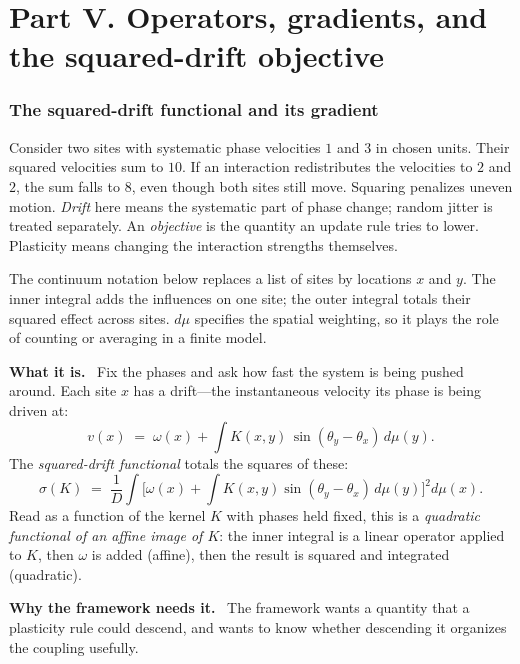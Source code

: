 \documentclass[11pt]{article}
\newcommand{\what}{\par\smallskip\noindent\textbf{What it is.}\ }
\newcommand{\why}{\par\smallskip\noindent\textbf{Why the framework needs it.}\ }
\begin{document}
\part*{Part V. Operators, gradients, and the squared-drift objective}
\section{The squared-drift functional and its gradient}
\label{sec:sigma}

Consider two sites with systematic phase velocities $1$ and $3$ in chosen
units. Their squared velocities sum to $10$. If an interaction redistributes
the velocities to $2$ and $2$, the sum falls to $8$, even though both sites
still move. Squaring penalizes uneven motion. \emph{Drift} here means the
systematic part of phase change; random jitter is treated separately. An
\emph{objective} is the quantity an update rule tries to lower. Plasticity
means changing the interaction strengths themselves.

The continuum notation below replaces a list of sites by locations $x$ and
$y$. The inner integral adds the influences on one site; the outer integral
totals their squared effect across sites. $d\mu$ specifies the spatial
weighting, so it plays the role of counting or averaging in a finite model.

\what
Fix the phases and ask how fast the system is being pushed around. Each site
$x$ has a drift---the instantaneous velocity its phase is being driven at:
\[
 v(x) \;=\; \omega(x) + \int K(x,y)\,\sin(\theta_y-\theta_x)\,d\mu(y) .
\]
The \emph{squared-drift functional} totals the squares of these:
\[
 \sigma(K) \;=\; \frac1D\int\Big[\omega(x)+\int K(x,y)\sin(\theta_y-\theta_x)\,d\mu(y)\Big]^{2}d\mu(x).
\]
Read as a function of the kernel $K$ with phases held fixed, this is a
\emph{quadratic functional of an affine image of $K$}: the inner integral is a
linear operator applied to $K$, then $\omega$ is added (affine), then the result
is squared and integrated (quadratic).

\why
The framework wants a quantity that a plasticity rule could descend, and wants
to know whether descending it organizes the coupling usefully.
\end{document}
